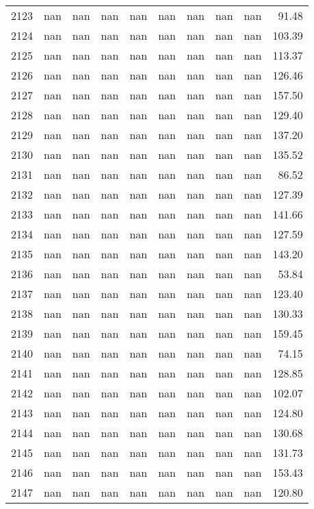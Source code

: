 \begin{tabular}{lrrrrrrrrr}
2123 & nan & nan & nan & nan & nan & nan & nan & nan & 91.48 \\
2124 & nan & nan & nan & nan & nan & nan & nan & nan & 103.39 \\
2125 & nan & nan & nan & nan & nan & nan & nan & nan & 113.37 \\
2126 & nan & nan & nan & nan & nan & nan & nan & nan & 126.46 \\
2127 & nan & nan & nan & nan & nan & nan & nan & nan & 157.50 \\
2128 & nan & nan & nan & nan & nan & nan & nan & nan & 129.40 \\
2129 & nan & nan & nan & nan & nan & nan & nan & nan & 137.20 \\
2130 & nan & nan & nan & nan & nan & nan & nan & nan & 135.52 \\
2131 & nan & nan & nan & nan & nan & nan & nan & nan & 86.52 \\
2132 & nan & nan & nan & nan & nan & nan & nan & nan & 127.39 \\
2133 & nan & nan & nan & nan & nan & nan & nan & nan & 141.66 \\
2134 & nan & nan & nan & nan & nan & nan & nan & nan & 127.59 \\
2135 & nan & nan & nan & nan & nan & nan & nan & nan & 143.20 \\
2136 & nan & nan & nan & nan & nan & nan & nan & nan & 53.84 \\
2137 & nan & nan & nan & nan & nan & nan & nan & nan & 123.40 \\
2138 & nan & nan & nan & nan & nan & nan & nan & nan & 130.33 \\
2139 & nan & nan & nan & nan & nan & nan & nan & nan & 159.45 \\
2140 & nan & nan & nan & nan & nan & nan & nan & nan & 74.15 \\
2141 & nan & nan & nan & nan & nan & nan & nan & nan & 128.85 \\
2142 & nan & nan & nan & nan & nan & nan & nan & nan & 102.07 \\
2143 & nan & nan & nan & nan & nan & nan & nan & nan & 124.80 \\
2144 & nan & nan & nan & nan & nan & nan & nan & nan & 130.68 \\
2145 & nan & nan & nan & nan & nan & nan & nan & nan & 131.73 \\
2146 & nan & nan & nan & nan & nan & nan & nan & nan & 153.43 \\
2147 & nan & nan & nan & nan & nan & nan & nan & nan & 120.80 \\

\end{tabular}
